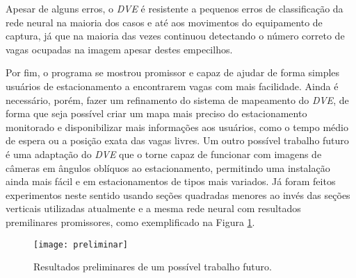 Apesar de alguns erros, o \textit{DVE} é resistente a pequenos erros de classificação da rede neural na maioria dos casos e até aos movimentos do equipamento de captura, já que na maioria das vezes continuou detectando o número correto de vagas ocupadas na imagem apesar destes empecilhos.

Por fim, o programa se mostrou promissor e capaz de ajudar de forma simples usuários de estacionamento a encontrarem vagas com mais facilidade. Ainda é necessário, porém, fazer um refinamento do sistema de mapeamento do \textit{DVE}, de forma que seja possível criar um mapa mais preciso do estacionamento monitorado e disponibilizar mais informações aos usuários, como o tempo médio de espera ou a posição exata das vagas livres. Um outro possível trabalho futuro é uma adaptação do \textit{DVE} que o torne capaz de funcionar com imagens de câmeras em ângulos oblíquos ao estacionamento, permitindo uma instalação ainda mais fácil e em estacionamentos de tipos mais variados. Já foram feitos experimentos neste sentido usando seções quadradas menores ao invés das seções verticais utilizadas atualmente e a mesma rede neural com resultados premilinares promissores, como exemplificado na Figura \ref{fig:preliminares}.

\begin{figure}%
\centering
\texttt{[image: preliminar]}%
\caption{Resultados preliminares de um possível trabalho futuro.}%
\label{fig:preliminares}%
\centering
\end{figure}









